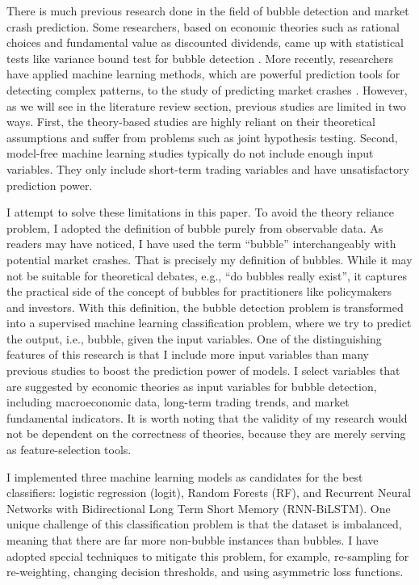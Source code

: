 \documentclass[12pt, man, a4paper, floatsintext]{apa7}
\begin{document}
There is much previous research done in the field of bubble detection and market crash prediction. Some researchers, based on economic theories such as rational choices and fundamental value as discounted dividends, came up with statistical tests like variance bound test for bubble detection \parencite{shiller2015IE}. More recently, researchers have applied machine learning methods, which are powerful prediction tools for detecting complex patterns, to the study of predicting market crashes \parencite{Chat2018}. However, as we will see in the literature review section, previous studies are limited in two ways. First, the theory-based studies are highly reliant on their theoretical assumptions and suffer from problems such as joint hypothesis testing. Second, model-free machine learning studies typically do not include enough input variables. They only include short-term trading variables and have unsatisfactory prediction power. 

I attempt to solve these limitations in this paper. To avoid the theory reliance problem, I adopted the definition of bubble purely from observable data. As readers may have noticed, I have used the term “bubble” interchangeably with potential market crashes. That is precisely my definition of bubbles. While it may not be suitable for theoretical debates, e.g., “do bubbles really exist”, it captures the practical side of the concept of bubbles for practitioners like policymakers and investors. With this definition, the bubble detection problem is transformed into a supervised machine learning classification problem, where we try to predict the output, i.e., bubble, given the input variables. One of the distinguishing features of this research is that I include more input variables than many previous studies to boost the prediction power of models. I select variables that are suggested by economic theories as input variables for bubble detection, including macroeconomic data, long-term trading trends, and market fundamental indicators. It is worth noting that the validity of my research would not be dependent on the correctness of theories, because they are merely serving as feature-selection tools.

I implemented three machine learning models as candidates for the best classifiers: logistic regression (logit), Random Forests (RF), and Recurrent Neural Networks with Bidirectional Long Term Short Memory (RNN-BiLSTM). One unique challenge of this classification problem is that the dataset is imbalanced, meaning that there are far more non-bubble instances than bubbles. I have adopted special techniques to mitigate this problem, for example, re-sampling for re-weighting, changing decision thresholds, and using asymmetric loss functions.  
\end{document}
